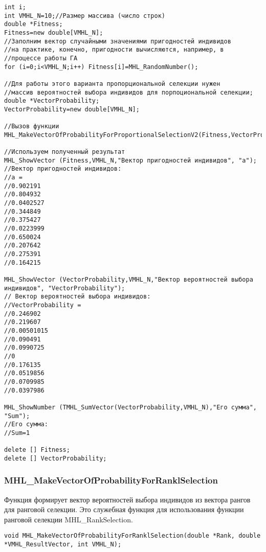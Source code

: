 \documentclass[a4paper,12pt]{article}
\begin{document}
\begin{lstlisting}[label=code_use_MHL_MakeVectorOfProbabilityForProportionalSelectionV2,caption=Пример использования]
int i;
int VMHL_N=10;//Размер массива (число строк)
double *Fitness;
Fitness=new double[VMHL_N];
//Заполним вектор случайными значениями пригодностей индивидов
//на практике, конечно, пригодности вычисляются, например, в
//процессе работы ГА
for (i=0;i<VMHL_N;i++) Fitness[i]=MHL_RandomNumber();

//Для работы этого варианта пропорциональной селекции нужен
//массив вероятностей выбора индивидов для порпоциональной селекции;
double *VectorProbability;
VectorProbability=new double[VMHL_N];

//Вызов функции
MHL_MakeVectorOfProbabilityForProportionalSelectionV2(Fitness,VectorProbability,VMHL_N);

//Используем полученный результат
MHL_ShowVector (Fitness,VMHL_N,"Вектор пригодностей индивидов", "a");
//Вектор пригодностей индивидов:
//a =	
//0.902191
//0.804932
//0.0402527
//0.344849
//0.375427
//0.0223999
//0.650024
//0.207642
//0.275391
//0.164215

MHL_ShowVector (VectorProbability,VMHL_N,"Вектор вероятностей выбора индивидов", "VectorProbability");
// Вектор вероятностей выбора индивидов:
//VectorProbability =	
//0.246902
//0.219607
//0.00501015
//0.090491
//0.0990725
//0
//0.176135
//0.0519856
//0.0709985
//0.0397986

MHL_ShowNumber (TMHL_SumVector(VectorProbability,VMHL_N),"Его сумма", "Sum");
//Его сумма:
//Sum=1

delete [] Fitness;
delete [] VectorProbability;
\end{lstlisting}

\subsubsection{MHL\_MakeVectorOfProbabilityForRanklSelection}\label{MHL_MakeVectorOfProbabilityForRanklSelection}

Функция формирует вектор вероятностей выбора индивидов из вектора рангов для ранговой селекции. Это служебная функция для использования функции ранговой селекции MHL\_RankSelection.


\begin{lstlisting}[label=code_syntax_MHL_MakeVectorOfProbabilityForRanklSelection,caption=Синтаксис]
void MHL_MakeVectorOfProbabilityForRanklSelection(double *Rank, double *VMHL_ResultVector, int VMHL_N);
\end{lstlisting}
\end{document}
